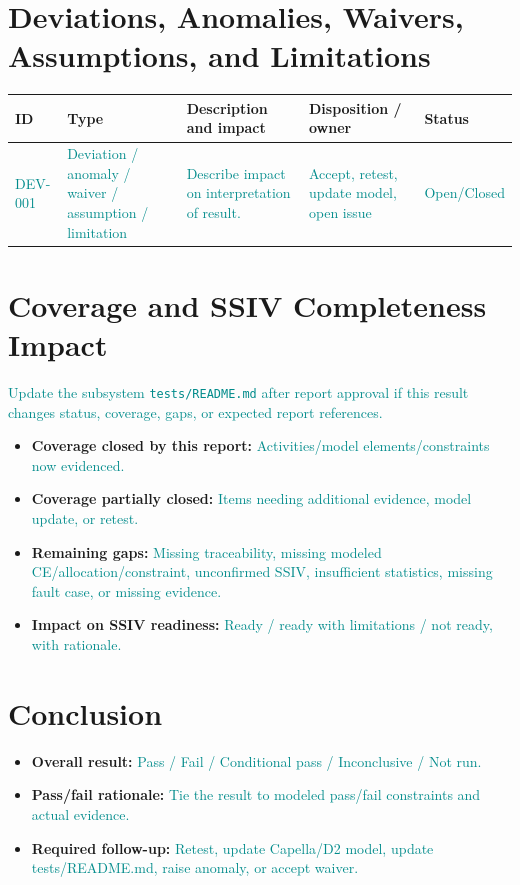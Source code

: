 \documentclass{../common/latex/delta_base_styles/delta_base_styles}
\newcommand{\placeholder}[1]{\textcolor{DarkCyan}{#1}}
\begin{document}
\section{Deviations, Anomalies, Waivers, Assumptions, and Limitations}
\begin{tabular}{|>{\centering\arraybackslash}m{2.0cm}
                |>{\centering\arraybackslash}m{2.4cm}
                |>{\centering\arraybackslash}m{5.2cm}
                |>{\centering\arraybackslash}m{3.1cm}
                |>{\centering\arraybackslash}m{2.6cm}|}
\hline
\textbf{ID} & \textbf{Type} & \textbf{Description and impact} & \textbf{Disposition / owner} & \textbf{Status} \\
\hline
\placeholder{DEV-001} & \placeholder{Deviation / anomaly / waiver / assumption / limitation} & \placeholder{Describe impact on interpretation of result.} & \placeholder{Accept, retest, update model, open issue} & \placeholder{Open/Closed} \\
\hline
\end{tabular}

\section{Coverage and SSIV Completeness Impact}
\placeholder{Update the subsystem \texttt{tests/README.md} after report approval if this result changes status, coverage, gaps, or expected report references.}

\begin{itemize}
  \item \textbf{Coverage closed by this report:} \placeholder{Activities/model elements/constraints now evidenced.}
  \item \textbf{Coverage partially closed:} \placeholder{Items needing additional evidence, model update, or retest.}
  \item \textbf{Remaining gaps:} \placeholder{Missing traceability, missing modeled CE/allocation/constraint, unconfirmed SSIV, insufficient statistics, missing fault case, or missing evidence.}
  \item \textbf{Impact on SSIV readiness:} \placeholder{Ready / ready with limitations / not ready, with rationale.}
\end{itemize}

\section{Conclusion}
\begin{itemize}
  \item \textbf{Overall result:} \placeholder{Pass / Fail / Conditional pass / Inconclusive / Not run.}
  \item \textbf{Pass/fail rationale:} \placeholder{Tie the result to modeled pass/fail constraints and actual evidence.}
  \item \textbf{Required follow-up:} \placeholder{Retest, update Capella/D2 model, update tests/README.md, raise anomaly, or accept waiver.}
\end{itemize}
\end{document}
